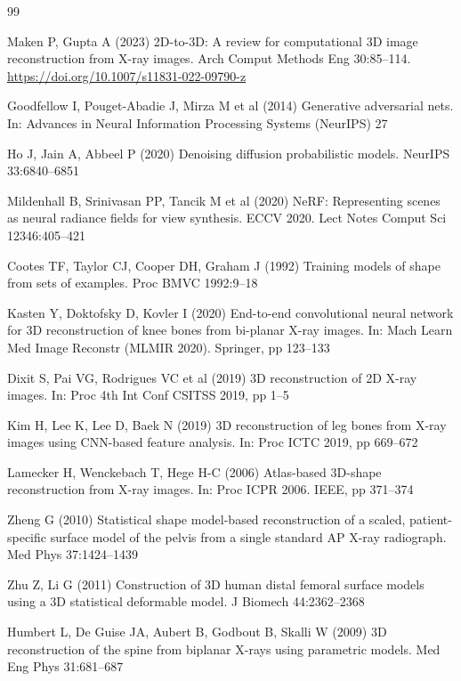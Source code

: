 \documentclass[10pt,twocolumn,a4paper]{article}
\begin{document}
\begin{thebibliography}{99}

Maken P, Gupta A (2023) 2D-to-3D: A review for computational 3D image
reconstruction from X-ray images. Arch Comput Methods Eng 30:85--114.
\url{https://doi.org/10.1007/s11831-022-09790-z}

Goodfellow I, Pouget-Abadie J, Mirza M et al (2014) Generative adversarial
nets. In: Advances in Neural Information Processing Systems (NeurIPS) 27

Ho J, Jain A, Abbeel P (2020) Denoising diffusion probabilistic models.
NeurIPS 33:6840--6851

Mildenhall B, Srinivasan PP, Tancik M et al (2020) NeRF: Representing scenes
as neural radiance fields for view synthesis. ECCV 2020. Lect Notes Comput Sci
12346:405--421

Cootes TF, Taylor CJ, Cooper DH, Graham J (1992) Training models of shape from
sets of examples. Proc BMVC 1992:9--18

Kasten Y, Doktofsky D, Kovler I (2020) End-to-end convolutional neural network
for 3D reconstruction of knee bones from bi-planar X-ray images. In: Mach Learn
Med Image Reconstr (MLMIR 2020). Springer, pp 123--133

Dixit S, Pai VG, Rodrigues VC et al (2019) 3D reconstruction of 2D X-ray
images. In: Proc 4th Int Conf CSITSS 2019, pp 1--5

Kim H, Lee K, Lee D, Baek N (2019) 3D reconstruction of leg bones from X-ray
images using CNN-based feature analysis. In: Proc ICTC 2019, pp 669--672

Lamecker H, Wenckebach T, Hege H-C (2006) Atlas-based 3D-shape reconstruction
from X-ray images. In: Proc ICPR 2006. IEEE, pp 371--374

Zheng G (2010) Statistical shape model-based reconstruction of a scaled,
patient-specific surface model of the pelvis from a single standard AP X-ray
radiograph. Med Phys 37:1424--1439

Zhu Z, Li G (2011) Construction of 3D human distal femoral surface models
using a 3D statistical deformable model. J Biomech 44:2362--2368

Humbert L, De Guise JA, Aubert B, Godbout B, Skalli W (2009) 3D reconstruction
of the spine from biplanar X-rays using parametric models. Med Eng Phys
31:681--687


\end{thebibliography}
\end{document}

